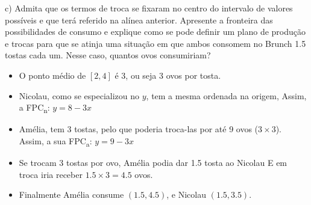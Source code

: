 \documentclass[]{beamer}
\begin{document}
\begin{frame}
    c) Admita que os termos de troca se fixaram no centro do intervalo de valores
possíveis e que terá referido na alínea anterior. Apresente a fronteira das
possibilidades de consumo e explique como se pode definir um plano de
produção e trocas para que se atinja uma situação em que ambos consomem no
Brunch 1.5 tostas cada um. Nesse caso, quantos ovos consumiriam?

\vspace{0.25in}
\begin{itemize}
    \item<2->{O ponto m\'edio de \([2, 4]\) \'e 3, ou seja 3 ovos por tosta.}
    \item<3->{Nicolau, como se especializou no $y$, tem a mesma ordenada na origem,
    Assim, a FPC\textsubscript{n}: $y = 8 - 3x$}
    \item<4->{Am\'elia, tem 3 tostas, pelo que poderia troca-las por at\'e 9 ovos ($3\times 3$).
    Assim, a sua FPC\textsubscript{a}: $y = 9 - 3x$}
    \item<5-> Se trocam 3 tostas por ovo, Am\'elia podia dar 1.5 tosta ao Nicolau E
    em troca iria receber $1.5 \times 3 = 4.5$ ovos.
    \item<6-> Finalmente Am\'elia consume $(1.5, 4.5)$, e Nicolau $(1.5, 3.5)$.
\end{itemize}

\end{frame}
\end{document}
